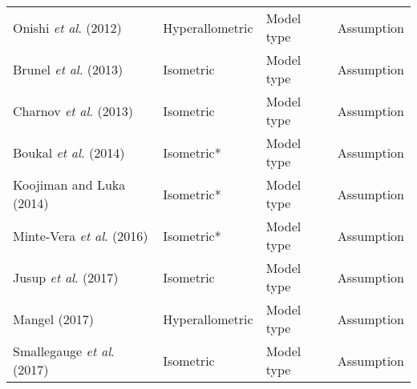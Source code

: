\documentclass[11pt]{article}
\begin{document}
\begin{table}[]
\begin{tabular}{llll}
    Onishi \textit{et al}. (2012)       & Hyperallometric  & Model type             & Assumption                        \\
    Brunel \textit{et al}. (2013)       & Isometric        & Model type             & Assumption                        \\
    Charnov \textit{et al}. (2013)      & Isometric        & Model type             & Assumption                        \\
    Boukal \textit{et al}. (2014)       & Isometric*       & Model type             & Assumption                        \\
    Koojiman and Luka (2014)            & Isometric*       & Model type             & Assumption                        \\
    Minte-Vera \textit{et al}. (2016)   & Isometric*       & Model type             & Assumption                        \\
    Jusup \textit{et al}. (2017)        & Isometric        & Model type             & Assumption                        \\
    Mangel (2017)                       & Hyperallometric  & Model type             & Assumption                        \\
    Smallegauge \textit{et al}. (2017)  & Isometric        & Model type             & Assumption                       
    \end{tabular}
    \end{table}
\end{document}
